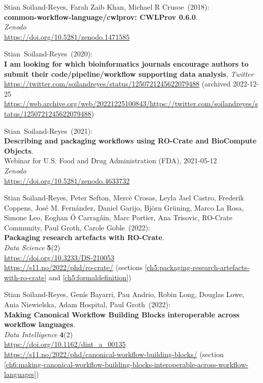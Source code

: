 \begin{thebibliography}{9}
Stian Soiland-Reyes, Farah Zaib Khan, Michael R Crusoe~(2018): \\
\textbf{common-workflow-language/cwlprov: CWLProv 0.6.0}.\\
\emph{Zenodo}\\
\url{https://doi.org/10.5281/zenodo.1471585}

Stian~Soiland-Reyes~(2020): \\
\textbf{I am looking for which bioinformatics journals encourage authors to submit their code/pipeline/workflow supporting data analysis},
\emph{Twitter}\\
\url{https://twitter.com/soilandreyes/status/1250721245622079488}
(archived 2022-12-25 
\url{https://web.archive.org/web/20221225100843/https://twitter.com/soilandreyes/status/1250721245622079488})

Stian~Soiland-Reyes~(2021): \\
\textbf{Describing and packaging workflows using RO-Crate and BioCompute Objects}.\\
Webinar for U.S. Food and Drug Administration
(FDA), 2021-05-12\\
\emph{Zenodo}\\
\url{https://doi.org/10.5281/zenodo.4633732}

Stian Soiland-Reyes, Peter Sefton, Mercè Crosas, Leyla Jael Castro, Frederik Coppens, José M. Fernández, Daniel Garijo, Björn Grüning, Marco La Rosa, Simone Leo, Eoghan Ó Carragáin, Marc Portier, Ana Trisovic, RO-Crate Community, Paul Groth, Carole Goble~(2022): \\
\textbf{Packaging research artefacts with RO-Crate}.\\
\emph{Data Science} \textbf{5}(2)\\
\url{https://doi.org/10.3233/DS-210053}\\
\url{https://s11.no/2022/phd/ro-crate/}
(sections \vref{ch5:packaging-research-artefacts-with-ro-crate} and \vref{ch5:formaldefinition})

Stian Soiland-Reyes, Genís Bayarri, Pau Andrio, Robin Long, Douglas Lowe, Ania Niewielska, Adam Hospital, Paul Groth~(2022): \\
\textbf{Making Canonical Workflow Building Blocks interoperable across workflow languages}.\\
\emph{Data Intelligence} \textbf{4}(2)\\
\url{https://doi.org/10.1162/dint_a_00135}\\
\url{https://s11.no/2022/phd/canonical-workflow-building-blocks/}
(section \vref{ch6:making-canonical-workflow-building-blocks-interoperable-across-workflow-languages})


\end{thebibliography}
